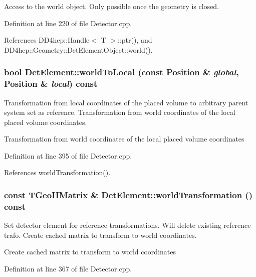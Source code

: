 Access to the world object. Only possible once the geometry is closed. 

Definition at line 220 of file Detector.cpp.

References DD4hep::Handle$<$ T $>$::ptr(), and DD4hep::Geometry::DetElementObject::world().\hypertarget{class_d_d4hep_1_1_geometry_1_1_det_element_af753b374a6f6d98934f00522dd1efcf9}{
\subsubsection[{worldToLocal}]{\setlength{\rightskip}{0pt plus 5cm}bool DetElement::worldToLocal (const {\bf Position} \& {\em global}, \/  {\bf Position} \& {\em local}) const}}
\label{class_d_d4hep_1_1_geometry_1_1_det_element_af753b374a6f6d98934f00522dd1efcf9}


Transformation from local coordinates of the placed volume to arbitrary parent system set as reference. Transformation from world coordinates of the local placed volume coordinates.

Transformation from world coordinates of the local placed volume coordinates 

Definition at line 395 of file Detector.cpp.

References worldTransformation().\hypertarget{class_d_d4hep_1_1_geometry_1_1_det_element_a60e3c04d0c0487207e62b98512a8f08c}{
\subsubsection[{worldTransformation}]{\setlength{\rightskip}{0pt plus 5cm}const TGeoHMatrix \& DetElement::worldTransformation () const}}
\label{class_d_d4hep_1_1_geometry_1_1_det_element_a60e3c04d0c0487207e62b98512a8f08c}


Set detector element for reference transformations. Will delete existing reference trafo. Create cached matrix to transform to world coordinates.

Create cached matrix to transform to world coordinates 

Definition at line 367 of file Detector.cpp.

